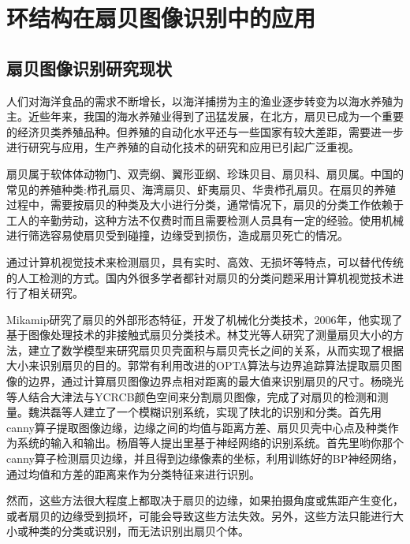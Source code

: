 

\chapter{环结构在扇贝图像识别中的应用}
\label{cha:intro}



\section{扇贝图像识别研究现状}
\label{}

人们对海洋食品的需求不断增长，以海洋捕捞为主的渔业逐步转变为以海水养殖为主。近些年来，我国的海水养殖业得到了迅猛发展，在北方，扇贝已成为一个重要的经济贝类养殖品种。但养殖的自动化水平还与一些国家有较大差距，需要进一步进行研究与应用，生产养殖的自动化技术的研究和应用已引起广泛重视\cite{zhucongrong}。

扇贝属于软体体动物门、双壳纲、翼形亚纲、珍珠贝目、扇贝科、扇贝属。中国的常见的养殖种类:栉孔扇贝、海湾扇贝、虾夷扇贝、华贵栉孔扇贝。在扇贝的养殖过程中，需要按扇贝的种类及大小进行分类，通常情况下，扇贝的分类工作依赖于工人的辛勤劳动，这种方法不仅费时而且需要检测人员具有一定的经验。使用机械进行筛选容易使扇贝受到碰撞，边缘受到损伤，造成扇贝死亡的情况。

通过计算机视觉技术来检测扇贝，具有实时、高效、无损坏等特点，可以替代传统的人工检测的方式。国内外很多学者都针对扇贝的分类问题采用计算机视觉技术进行了相关研究。

Mikamip\cite{mikamip}研究了扇贝的外部形态特征，开发了机械化分类技术，2006年，他实现了基于图像处理技术的非接触式扇贝分类技术。林艾光\cite{linaiguang}等人研究了测量扇贝大小的方法，建立了数学模型来研究扇贝贝壳面积与扇贝壳长之间的关系，从而实现了根据大小来识别扇贝的目的。郭常有\cite{guochangyou}利用改进的OPTA算法与边界追踪算法提取扇贝图像的边界，通过计算扇贝图像边界点相对距离的最大值来识别扇贝的尺寸。杨晓光\cite{yangxiaoguang}等人结合大津法与YCRCB颜色空间来分割扇贝图像，完成了对扇贝的检测和测量。魏洪磊\cite{weihonglei}等人建立了一个模糊识别系统，实现了陕北的识别和分类。首先用canny算子提取图像边缘，边缘之间的均值与距离方差、扇贝贝壳中心点及种类作为系统的输入和输出。杨眉\cite{yangmei}等人提出里基于神经网络的识别系统。首先里哟你那个canny算子检测扇贝边缘，并且得到边缘像素的坐标，利用训练好的BP神经网络，通过均值和方差的距离来作为分类特征来进行识别。

然而，这些方法很大程度上都取决于扇贝的边缘，如果拍摄角度或焦距产生变化，或者扇贝的边缘受到损坏，可能会导致这些方法失效。另外，这些方法只能进行大小或种类的分类或识别，而无法识别出扇贝个体。

